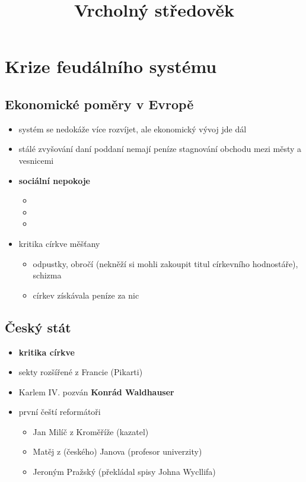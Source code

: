 \title{Vrcholný středověk}




\section{Krize feudálního systému}
\subsection{Ekonomické poměry v Evropě}
\begin{itemize}
\item systém se nedokáže více rozvíjet, ale ekonomický vývoj jde dál
\item stálé zvyšování daní \ra poddaní nemají peníze \ra stagnování obchodu mezi městy a vesnicemi
\item[\ra] \textbf{sociální nepokoje}
	\begin{itemize}
	\item {}
	\item {}
	\item {}
	\end{itemize}
\item kritika církve měšťany
	\begin{itemize}
	\item odpustky, obročí (nekněží si mohli zakoupit titul církevního hodnostáře), schizma
	\item církev získávala peníze za nic
	\end{itemize}
\end{itemize}

\subsection{Český stát}
\begin{itemize}
\item \textbf{kritika církve}
\item sekty rozšířené z Francie (Pikarti)
\item Karlem IV. pozván \textbf{Konrád Waldhauser}
\item první čeští reformátoři
	\begin{itemize}
	\item Jan Milíč z Kroměříže (kazatel)
	\item Matěj z (českého) Janova (profesor univerzity)
	\item Jeroným Pražský (překládal spisy Johna Wycllifa)
	\end{itemize}
\end{itemize}

